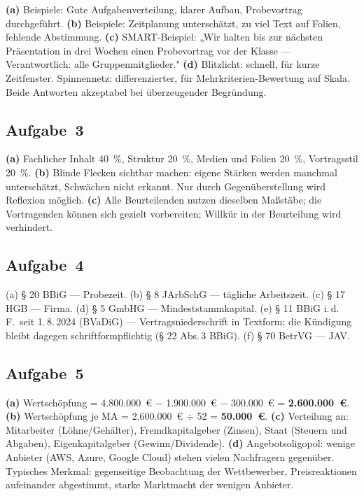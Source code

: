\documentclass[11pt, a4paper]{article}
\begin{document}
\textbf{(a)} Beispiele: Gute Aufgabenverteilung, klarer Aufbau, Probevortrag durchgeführt.
\textbf{(b)} Beispiele: Zeitplanung unterschätzt, zu viel Text auf Folien, fehlende Abstimmung.
\textbf{(c)} SMART-Beispiel: „Wir halten bis zur nächsten Präsentation in drei Wochen einen
Probevortrag vor der Klasse --- Verantwortlich: alle Gruppenmitglieder."
\textbf{(d)} Blitzlicht: schnell, für kurze Zeitfenster. Spinnennetz: differenzierter,
für Mehrkriterien-Bewertung auf Skala. Beide Antworten akzeptabel bei überzeugender Begründung.

\subsection*{Aufgabe~3}

\textbf{(a)} Fachlicher Inhalt 40~\%, Struktur 20~\%, Medien und Folien 20~\%,
Vortragsstil 20~\%.
\textbf{(b)} Blinde Flecken sichtbar machen: eigene Stärken werden manchmal unterschätzt,
Schwächen nicht erkannt. Nur durch Gegenüberstellung wird Reflexion möglich.
\textbf{(c)} Alle Beurteilenden nutzen dieselben Maßstäbe; die Vortragenden können
sich gezielt vorbereiten; Willkür in der Beurteilung wird verhindert.

\subsection*{Aufgabe~4}

(a) § 20 BBiG --- Probezeit.
(b) § 8 JArbSchG --- tägliche Arbeitszeit.
(c) § 17 HGB --- Firma.
(d) § 5 GmbHG --- Mindeststammkapital.
(e) § 11 BBiG i.\,d.\,F.\ seit 1.\,8.\,2024 (BVaDiG) --- Vertragsniederschrift in Textform; die Kündigung bleibt dagegen schriftformpflichtig (§ 22 Abs.\,3 BBiG).
(f) § 70 BetrVG --- JAV.

\subsection*{Aufgabe~5}

\textbf{(a)} Wertschöpfung = 4.800.000~€ $-$ 1.900.000~€ $-$ 300.000~€ = \textbf{2.600.000~€}.
\textbf{(b)} Wertschöpfung je MA = 2.600.000~€ $\div$ 52 = \textbf{50.000~€}.
\textbf{(c)} Verteilung an: Mitarbeiter (Löhne/Gehälter), Fremdkapitalgeber (Zinsen),
Staat (Steuern und Abgaben), Eigenkapitalgeber (Gewinn/Dividende).
\textbf{(d)} Angebotsoligopol: wenige Anbieter (AWS, Azure, Google Cloud) stehen vielen
Nachfragern gegenüber. Typisches Merkmal: gegenseitige Beobachtung der Wettbewerber,
Preisreaktionen aufeinander abgestimmt, starke Marktmacht der wenigen Anbieter.
\end{document}
